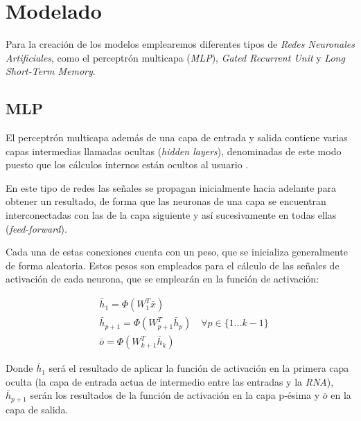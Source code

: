 \section{Modelado}

Para la creación de los modelos emplearemos diferentes tipos de \textit{Redes Neuronales Artificiales}, como 
el perceptrón multicapa (\textit{MLP}), \textit{Gated Recurrent Unit} y \textit{Long Short-Term Memory}.

\subsection{MLP}
El perceptrón multicapa además de una capa de entrada y salida contiene varias capas intermedias
llamadas ocultas (\textit{hidden layers}), denominadas de este modo puesto que los cálculos
internos están ocultos al usuario \cite{book:aggarwal2018}.

En este tipo de redes las señales se propagan inicialmente hacia adelante para obtener un resultado, 
de forma que las neuronas de una capa se encuentran interconectadas con las de la capa
siguiente y así sucesivamente en todas ellas (\textit{feed-forward}).

Cada una de estas conexiones cuenta con un peso, que se inicializa generalmente de forma aleatoria. Estos pesos son
empleados para el cálculo de las señales de activación de cada neurona, que se emplearán en la función de activación:

\begin{equation}
    \begin{aligned}
    & \bar{h}_1=\Phi\left(W_1^T \bar{x}\right) \\
    & \bar{h}_{p+1}=\Phi\left(W_{p+1}^T \bar{h}_p\right) \quad \forall p \in\{1 \ldots k-1\}\\
    & \bar{o}=\Phi\left(W_{k+1}^T \bar{h}_k\right)
    \end{aligned}
\end{equation}

Donde \begin{math}\bar{h}_1\end{math} será el resultado de aplicar la función de activación en la primera capa oculta (la capa de entrada
actua de intermedio entre las entradas y la \textit{RNA}), \begin{math}\bar{h}_{p+1}\end{math} serán los resultados de la función de activación
en la capa p-ésima y \begin{math}\bar{o}\end{math} en la capa de salida.

